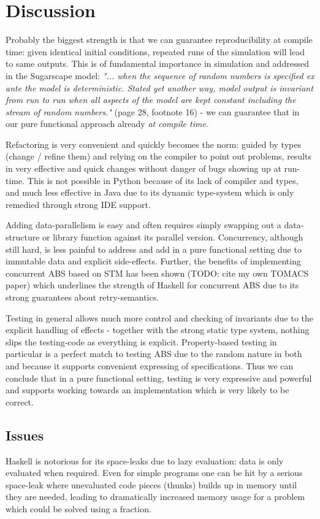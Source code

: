 \section{Discussion}
\label{sec:discussion}
Probably the biggest strength is that we can guarantee reproducibility at compile time: given identical initial conditions, repeated runs of the simulation will lead to same outputs. This is of fundamental importance in simulation and addressed in the Sugarscape model: \textit{"... when the sequence of random numbers is specified ex ante the model is deterministic. Stated yet another way, model output is invariant from run to run when all aspects of the model are kept constant including the stream of random numbers."} (page 28, footnote 16) - we can guarantee that in our pure functional approach already \textit{at compile time}.

Refactoring is very convenient and quickly becomes the norm: guided by types (change / refine them) and relying on the compiler to point out problems, results in very effective and quick changes without danger of bugs showing up at run-time. This is not possible in Python because of its lack of compiler and types, and much less effective in Java due to its dynamic type-system which is only remedied through strong IDE support.

Adding data-parallelism is easy and often requires simply swapping out a data-structure or library function against its parallel version. Concurrency, although still hard, is less painful to address and add in a pure functional setting due to immutable data and explicit side-effects. Further, the benefits of implementing concurrent ABS based on STM has been shown (TODO: cite my own TOMACS paper) which underlines the strength of Haskell for concurrent ABS due to its strong guarantees about retry-semantics.

Testing in general allows much more control and checking of invariants due to the explicit handling of effects - together with the strong static type system, nothing slips the testing-code as everything is explicit. Property-based testing in particular is a perfect match to testing ABS due to the random nature in both and because it supports convenient expressing of specifications. Thus we can conclude that in a pure functional setting, testing is very expressive and powerful and supports working towards an implementation which is very likely to be correct.

\subsection{Issues}
Haskell is notorious for its space-leaks due to lazy evaluation: data is only evaluated when required. Even for simple programs one can be hit by a serious space-leak where unevaluated code pieces (thunks) builds up in memory until they are needed, leading to dramatically increased memory usage for a problem which could be solved using a fraction.

